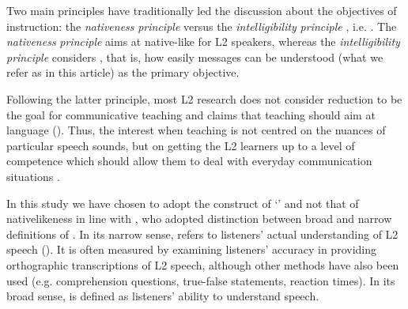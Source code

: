 \documentclass[output=paper]{langsci/langscibook}
\begin{document}
Two main principles have traditionally led the discussion about the objectives of  instruction: the \textit{nativeness} \textit{principle} versus the \textit{intelligibility} \textit{principle} \citep{Levis2005}, i.e. . The \textit{nativeness} \textit{principle} aims at native-like  for {L2} speakers, whereas the \textit{intelligibility} \textit{principle} considers , that is, how easily messages can be understood (what we refer as  in this article) as the primary objective. 

Following the latter principle, most {L2}  research does not consider  reduction to be the goal for communicative teaching and claims that  teaching should aim at language  (\citealt{Kenworthy1987,Pennington1996,Derwing2008,Thomson2013}). Thus, the interest when teaching  is not centred on the nuances of particular speech sounds, but on getting the {L2} learners up to a level of competence which should allow them to deal with everyday communication situations \citep{Gimson1994}. 

In this study we have chosen to adopt the construct of ‘’ and not that of nativelikeness  in line with \citet{IsaacsTrofimovich2012}, who adopted  distinction between broad and narrow definitions of . In its narrow sense,  refers to listeners’ actual understanding of {L2} speech (\citealt{MunroDerwing1999}). It is often measured by examining listeners’ accuracy in providing orthographic transcriptions of {L2} speech, although other methods have also been used (e.g. comprehension questions, true-false statements, reaction times). In its broad sense,  is defined as listeners’ ability to understand speech. 
\end{document}
